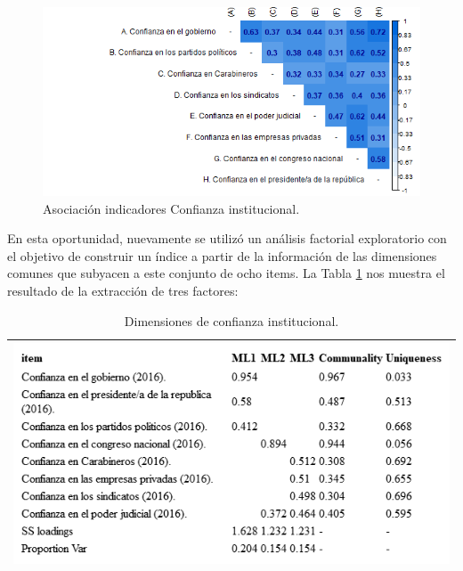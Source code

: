 \documentclass[
  12pt,
]{book}
\begin{document}
\begin{figure}[H]

{\centering \includegraphics[width=1\linewidth,height=1\textheight]{output/graphs/confianza-institucional_cor} 

}

\caption{Asociación indicadores Confianza institucional.}\label{fig:confianza-institucional-cor}
\end{figure}

En esta oportunidad, nuevamente se utilizó un análisis factorial exploratorio con el objetivo de construir un índice a partir de la información de las dimensiones comunes que subyacen a este conjunto de ocho items. La Tabla \ref{tab:inst-fa} nos muestra el resultado de la extracción de tres factores:

\begin{longtable}[]{@{}l@{}}
\caption{\label{tab:inst-fa}Dimensiones de confianza institucional.}\tabularnewline
\toprule
\endhead
\includegraphics[width=8.33333in,height=\textheight]{output/tables/inst_fa.png}\tabularnewline
\bottomrule
\end{longtable}
\end{document}
